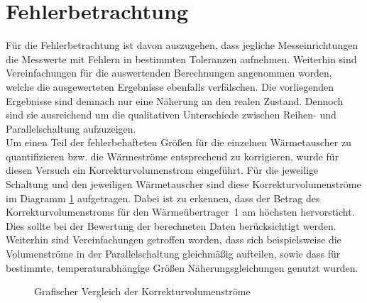 \section{Fehlerbetrachtung}
\label{sec:fehler}
Für die Fehlerbetrachtung ist davon auszugehen, dass jegliche Messeinrichtungen die Messwerte mit Fehlern in bestimmten Toleranzen aufnehmen. Weiterhin sind Vereinfachungen für die auswertenden Berechnungen angenommen worden, welche die ausgewerteten Ergebnisse ebenfalls verfälschen. Die vorliegenden Ergebnisse sind demnach nur eine Näherung an den realen Zustand. Dennoch sind sie ausreichend um die qualitativen Unterschiede zwischen Reihen- und Parallelschaltung aufzuzeigen.\\
Um einen Teil der fehlerbehafteten Größen für die einzelnen Wärmetauscher zu quantifizieren bzw. die Wärmeströme entsprechend zu korrigieren, wurde für diesen Versuch ein Korrekturvolumenstrom eingeführt. Für die jeweilige Schaltung und den jeweiligen Wärmetauscher sind diese Korrekturvolumenströme im Diagramm \ref{dia:korrrek} aufgetragen. Dabei ist zu erkennen, dass der Betrag des Korrekturvolumenstroms für den \mbox{Wärmeübertrager 1} am höchsten hervorsticht. Dies sollte bei der Bewertung der berechneten Daten berücksichtigt werden.\\
Weiterhin sind Vereinfachungen getroffen worden, dass sich beispielsweise die Volumenströme in der Parallelschaltung gleichmäßig aufteilen, sowie dass für bestimmte, temperaturabhängige Größen Näherungsgleichungen genutzt wurden.

\begin{figure}[h!]
	\begin{center}
		\caption{Grafischer Vergleich der Korrekturvolumenströme}
		\label{dia:korrrek}
	\end{center}
\end{figure}
\FloatBarrier
\newpage

